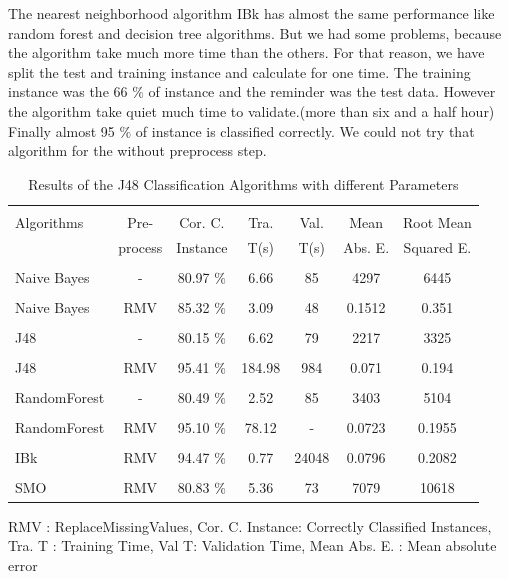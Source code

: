 \documentclass[a4paper]{article}
\begin{document}
The nearest neighborhood algorithm IBk has almost the same performance like random forest and decision tree algorithms. But we had some problems, because the algorithm take much more time than the others. For that reason, we have split the test and training instance and calculate for one time. The training instance was the  66 $\%$ of instance and the reminder was the test data. However the algorithm take quiet much time to validate.(more than six and a half hour) Finally almost 95 $\%$ of instance is classified correctly. We could not try that algorithm for the without preprocess step.


\begin{table}
\begin{tabular}{|l| c | c | c | c |c |c |}

\hline & & & & & & \\
Algorithms & Pre- & Cor. C.& Tra. & Val. & Mean & Root Mean \\
 & process  & Instance & T(s) &  T(s) &  Abs. E. & Squared E. \\
\hline & & & & & & \\
Naive Bayes		& - &			80.97  $\%$ & 6.66 	& 85 & 4297  & 6445 \\ 
\hline & & & & & & \\
Naive Bayes	 	& RMV &	85.32 $\%$ & 3.09 & 48	 &  0.1512  & 0.351  \\ 
\hline & & & & & & \\
J48	 		& - &			80.15  $\%$ & 6.62 & 79 &  2217 & 3325\\ 
\hline 	& & & & & & \\
J48  			& RMV &			95.41 $\%$ & 184.98 & 984 &  0.071 & 0.194 \\ 
\hline & & & & & & \\
RandomForest  	 & - &			80.49 $\%$ & 2.52 & 85 &  3403 & 5104 \\ 
\hline & & & & & & \\
RandomForest 	& RMV &			 95.10 $\%$ & 78.12 &  -  & 0.0723 & 0.1955 \\ 
\hline & & & & & & \\
IBk 			& RMV &			94.47 $\%$ & 0.77 &  24048 & 0.0796 & 0.2082\\ 
\hline & & & & & & \\
SMO 			& RMV &			 80.83 $\%$ & 5.36 &  73 & 7079 & 10618\\ 
\hline
\end{tabular}
\caption{Results of the J48 Classification Algorithms with different Parameters}
    RMV : ReplaceMissingValues,
	Cor. C. Instance:  Correctly Classified Instances,
	Tra. T : Training Time,
	Val T: Validation Time,
	Mean Abs. E. : Mean absolute error 
\end{table}
\end{document}
